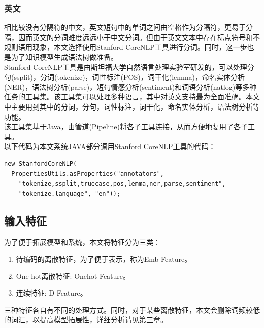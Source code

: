 \subsubsection{英文}
相比较没有分隔符的中文，英文短句中的单词之间由空格作为分隔符，更易于分隔，因而英文的分词难度远远小于中文分词。但由于英文文本中存在标点符号和不规则语用现象，本文选择使用Stanford CoreNLP工具进行分词。同时，这一步也是为了知识模型生成语法树做准备。\\
Stanford CoreNLP工具是由斯坦福大学自然语言处理实验室研发的\cite{corenlp}，可以处理分句(ssplit)，分词(tokenize)，词性标注(POS)，词干化(lemma)，命名实体分析(NER)，语法树分析(parse)，短句情感分析(sentiment)和词语分析(natlog)等多种任务的工具集。该工具集可以处理多种语言，其中对英文支持最为全面准确。本文中主要用到其中的分词，分句，词性标注，词干化，命名实体分析，语法树分析等功能。\\
该工具集基于Java，由管道(Pipeline)将各子工具连接，从而方便地复用了各子工具。\\
以下代码为本文系统JAVA部分调用Stanford CoreNLP工具的代码：\\
\lstset{language=java}
\begin{lstlisting}
new StanfordCoreNLP(
  PropertiesUtils.asProperties("annotators",
    "tokenize,ssplit,truecase,pos,lemma,ner,parse,sentiment",
    "tokenize.language", "en"));
\end{lstlisting}

\subsection{输入特征}
为了便于拓展模型和系统，本文将特征分为三类：
\begin{enumerate}
\item 待编码的离散特征，为了便于表示，称为Emb Feature。
\item One-hot离散特征: Onehot Feature。
\item 连续特征: D Feature。
\end{enumerate}
三种特征各自有不同的处理方式。同时，对于某些离散特征，本文会删除词频较低的词汇，以提高模型拓展性，详细分析请见第三章。
